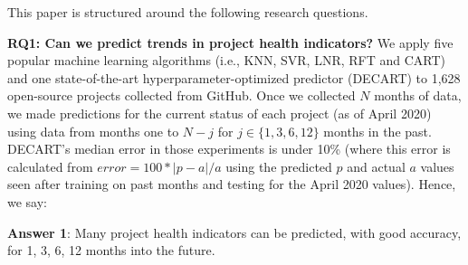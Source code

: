 \documentclass[sigconf,review,anonymous]{acmart}
\begin{document}
 
 

 

  
\noindent
This paper is structured around the following  research questions.
  

 
 

 



\textbf{RQ1: Can we predict   trends in project health indicators?}
We apply five popular machine learning algorithms (i.e., KNN, SVR, LNR, RFT and CART) and one state-of-the-art hyperparameter-optimized predictor (DECART) to   1,628 open-source projects collected from GitHub. 
Once we collected $N$ months of data, we made predictions for  the current status of each project
(as of April 2020)
using data from months one to  $\mathit{N-j}$  for $\mathit{j\in\{1,3,6,12\}}$  months in the past.
 DECART's median error in those experiments is under 10\%
 (where  this error is  calculated from  $\mathit{error}=100*|p-a|/a$  using the predicted $p$ and actual $a$  values  seen after   training on past months and testing for the April 2020 values). Hence, we say:




\begin{blockquote}
\noindent
\textbf{Answer 1}: Many project health indicators can be predicted, with good accuracy, for 1, 3, 6, 12   months into the future.
\end{blockquote} 
\end{document}
